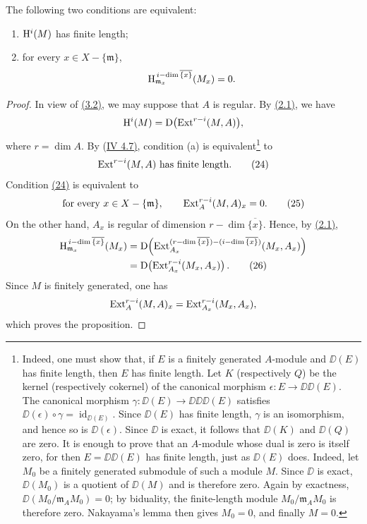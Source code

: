 \begin{sgaproposition}
The following two conditions are equivalent:
\begin{enumerate}
  \item[(a)] $\mathrm H^i(M)$ has finite length;
  \item[(b)] for every $x\in X-\{\mathfrak m\}$,
  \[
    \mathrm H_{\mathfrak m_x}^{\,i-\dim\overline{\{x\}}}(M_x)=0.
  \]
\end{enumerate}
\end{sgaproposition}

\begin{proof}
\renewcommand{\qedsymbol}{}
In view of \textup{\hyperref[V.3.2]{(3.2)}}, we may suppose that $A$ is regular. By
\textup{\hyperref[V.2.1]{(2.1)}}, we have
\[
  \mathrm H^i(M)=\mathrm D\bigl(\operatorname{Ext}^{r-i}(M,A)\bigr),
\]
where $r=\dim A$. By \textup{(\hyperref[IV.4.7]{IV 4.7)}}, condition \textup{(a)} is
equivalent\footnote{Indeed, one must show that, if $E$ is a finitely generated
$A$-module and $\DD(E)$ has finite length, then $E$ has finite length. Let $K$
(respectively $Q$) be the kernel (respectively cokernel) of the canonical
morphism $\epsilon\colon E\to\DD\DD(E)$. The canonical morphism
$\gamma\colon\DD(E)\to\DD\DD\DD(E)$ satisfies
$\DD(\epsilon)\circ\gamma=\operatorname{id}_{\DD(E)}$. Since $\DD(E)$ has
finite length, $\gamma$ is an isomorphism, and hence so is
$\DD(\epsilon)$. Since $\DD$ is exact, it follows that $\DD(K)$ and
$\DD(Q)$ are zero. It is enough to prove that an $A$-module whose dual is zero
is itself zero, for then $E=\DD\DD(E)$ has finite length, just as $\DD(E)$
does. Indeed, let $M_0$ be a finitely generated submodule of such a module
$M$. Since $\DD$ is exact, $\DD(M_0)$ is a quotient of $\DD(M)$ and is
therefore zero. Again by exactness,
$\DD(M_0/\mathfrak m_A M_0)=0$; by biduality, the finite-length module
$M_0/\mathfrak m_A M_0$ is therefore zero. Nakayama's lemma then gives
$M_0=0$, and finally $M=0$.} to
\begin{equation}
  \operatorname{Ext}^{r-i}(M,A)\text{ has finite length}. \tag{24}\label{eq:V.24}
\end{equation}
Condition \textup{\hyperref[eq:V.24]{(24)}} is equivalent to
\begin{equation}
  \text{for every }x\in X-\{\mathfrak m\},\qquad
  \operatorname{Ext}_A^{r-i}(M,A)_x=0. \tag{25}\label{eq:V.25}
\end{equation}
On the other hand, $A_x$ is regular of dimension
$r-\dim\overline{\{x\}}$. Hence, by \textup{\hyperref[V.2.1]{(2.1)}},
\begin{align}
  \mathrm H_{\mathfrak m_x}^{\,i-\dim\overline{\{x\}}}(M_x)
  &={\mathrm D}\!\left(
    \operatorname{Ext}_{A_x}^{(r-\dim\overline{\{x\}})
      -(i-\dim\overline{\{x\}})}(M_x,A_x)
  \right) \notag\\
  &={\mathrm D}\!\left(\operatorname{Ext}_{A_x}^{r-i}(M_x,A_x)\right). \tag{26}\label{eq:V.26}
\end{align}
Since $M$ is finitely generated, one has
\[
  \operatorname{Ext}_A^{r-i}(M,A)_x
  =\operatorname{Ext}_{A_x}^{r-i}(M_x,A_x),
\]
which proves the proposition.
\end{proof}

